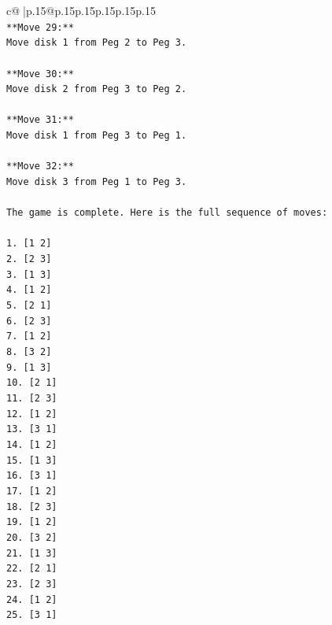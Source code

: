 \documentclass{article}
\begin{document}
{\begin{supertabular}{c@{$\;$}|p{.15\linewidth}@{}p{.15\linewidth}p{.15\linewidth}p{.15\linewidth}p{.15\linewidth}p{.15\linewidth}}
{{{\\ 
\texttt{**Move 29:**} \\
\texttt{Move disk 1 from Peg 2 to Peg 3.} \\
\\ 
\texttt{**Move 30:**} \\
\texttt{Move disk 2 from Peg 3 to Peg 2.} \\
\\ 
\texttt{**Move 31:**} \\
\texttt{Move disk 1 from Peg 3 to Peg 1.} \\
\\ 
\texttt{**Move 32:**} \\
\texttt{Move disk 3 from Peg 1 to Peg 3.} \\
\\ 
\texttt{The game is complete. Here is the full sequence of moves:} \\
\\ 
\texttt{1.  {[}1 2{]}} \\
\texttt{2.  {[}2 3{]}} \\
\texttt{3.  {[}1 3{]}} \\
\texttt{4.  {[}1 2{]}} \\
\texttt{5.  {[}2 1{]}} \\
\texttt{6.  {[}2 3{]}} \\
\texttt{7.  {[}1 2{]}} \\
\texttt{8.  {[}3 2{]}} \\
\texttt{9.  {[}1 3{]}} \\
\texttt{10. {[}2 1{]}} \\
\texttt{11. {[}2 3{]}} \\
\texttt{12. {[}1 2{]}} \\
\texttt{13. {[}3 1{]}} \\
\texttt{14. {[}1 2{]}} \\
\texttt{15. {[}1 3{]}} \\
\texttt{16. {[}3 1{]}} \\
\texttt{17. {[}1 2{]}} \\
\texttt{18. {[}2 3{]}} \\
\texttt{19. {[}1 2{]}} \\
\texttt{20. {[}3 2{]}} \\
\texttt{21. {[}1 3{]}} \\
\texttt{22. {[}2 1{]}} \\
\texttt{23. {[}2 3{]}} \\
\texttt{24. {[}1 2{]}} \\
\texttt{25. {[}3 1{]}} \\
}}}
\end{supertabular}}
\end{document}
